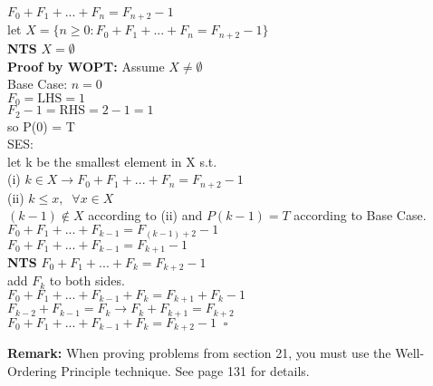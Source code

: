 \documentclass[12pt]{article}
\begin{document}
\begin{enumerate}
    $F_0 + F_1 + ... + F_n = F_{n+2} -1 $\\
    let $X = \{ n \geq 0 : F_0 + F_1 + ... + F_n = F_{n+2} -1\}$\\
    \textbf{NTS} $X=\emptyset$\\
    \textbf{Proof by WOPT: } Assume $X \neq \emptyset$\\
    Base Case: $n=0$\\
    $F_0 = \mbox{LHS} = 1$\\
    $F_2 -1 = \mbox{RHS}= 2 - 1=1$\\
    so P(0) = T \\
    SES:\\
    let k be the smallest element in X s.t.\\
    (i) $k \in X \rightarrow F_0 + F_1 + ... + F_n = F_{n+2} -1$ \\
    (ii) $k \leq x, \;\; \forall x \in X$\\
    $(k-1) \notin X$ according to (ii) and $P(k-1) = T$ according to Base Case.\\
    
    $F_0 + F_1 + ... + F_{k-1} = F_{(k-1)+2} -1$\\
    
    $F_0 + F_1 + ... + F_{k-1} = F_{k+1} -1$\\
    
    \textbf{NTS} $F_0 + F_1 + ... + F_k = F_{k+2} -1 $\\
    
    add $F_{k}$ to both sides.\\
    
    $F_0 + F_1 + ... + F_{k-1} + F_{k}  = F_{k+1} + F_{k} -1$\\
    
    
    
    $  F_{k-2} + F_{k-1} = F_{k} \rightarrow F_{k} + F_{k+1} = F_{k+2}$\\
    
    $F_0 + F_1 + ... + F_{k-1} + F_{k}  = F_{k+2} -1 \;\; \square$\\
    
\end{enumerate}





\noindent \textbf{Remark:}  When proving problems from section 21, you must use the Well-Ordering Principle technique.  See page 131 for details.
\end{document}
